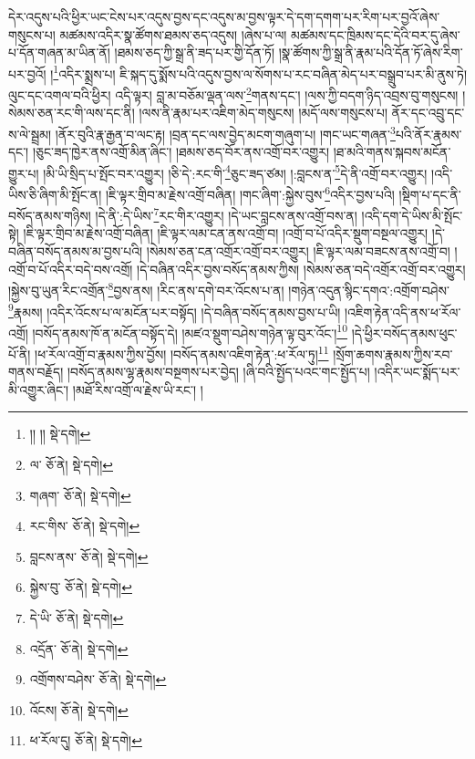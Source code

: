 དེར་འདུས་པའི་ཕྱིར་ཡང་ངེས་པར་འདུས་བྱས་དང་འདུས་མ་བྱས་ལྟར་དེ་དག་དགག་པར་རིག་པར་བྱའོ་ཞེས་གསུངས་པ། མཚམས་འདིར་སྣ་ཚོགས་ཐམས་ཅད་འདུས། །ཞེས་པ་ལ། མཚམས་དང་ཁྲིམས་དང་དེའི་བར་དུ་ཞེས་པ་དོན་གཞན་མ་ཡིན་ནོ། །ཐམས་ཅད་ཀྱི་སྒྲ་ནི་ཟད་པར་གྱི་དོན་ཏོ། །སྣ་ཚོགས་ཀྱི་སྒྲ་ནི་རྣམ་པའི་དོན་ཏོ་ཞེས་རིག་པར་བྱའོ། །\footnote{།། །།  སྡེ་དགེ། }འདིར་སྨྲས་པ། ཇི་སྐད་དུ་སྨོས་པའི་འདུས་བྱས་ལ་སོགས་པ་རང་བཞིན་མེད་པར་བསྒྲུབ་པར་མི་ནུས་ཏེ། ལུང་དང་འགལ་བའི་ཕྱིར། འདི་ལྟར། བླ་མ་བཅོམ་ལྡན་ལས་\footnote{ལ་  ཅོ་ནེ།  སྡེ་དགེ། }གནས་དང་། །ལས་ཀྱི་བདག་ཉིད་འབྲས་བུ་གསུངས། །སེམས་ཅན་རང་གི་ལས་དང་ནི། །ལས་ནི་རྣམ་པར་འཇིག་མེད་གསུངས། །མདོ་ལས་གསུངས་པ། ནོར་དང་འབྲུ་དང་ས་ལེ་སྦྲམ། །ནོར་བུའི་རྣ་རྒྱན་བ་ལང་རྟ། །བྲན་དང་ལས་བྱེད་མངག་གཞུག་པ། །གང་ཡང་གཞན་\footnote{གཞག་  ཅོ་ནེ།  སྡེ་དགེ། }པའི་ནོར་རྣམས་དང་། །ཅུང་ཟད་ཁྱེར་ནས་འགྲོ་མིན་ཞིང་། །ཐམས་ཅད་བོར་ནས་འགྲོ་བར་འགྱུར། །ཐ་མའི་གནས་སྐབས་མངོན་གྱུར་པ། །མི་ཡི་སྲིད་པ་སྤོང་བར་འགྱུར། །ཅི་དེ་:རང་གི་\footnote{རང་གིས་  ཅོ་ནེ།  སྡེ་དགེ། }ཅུང་ཟད་ཙམ། །:བླངས་ན་\footnote{བླངས་ནས་  ཅོ་ནེ།  སྡེ་དགེ། }དེ་ནི་འགྲོ་བར་འགྱུར། །འདི་ཡིས་ཅི་ཞིག་མི་སྤོང་ན། །ཇི་ལྟར་གྲིབ་མ་རྗེས་འགྲོ་བཞིན། །གང་ཞིག་:སྐྱེས་བུས་\footnote{སྐྱེས་བུ་  ཅོ་ནེ།  སྡེ་དགེ། }འདིར་བྱས་པའི། །སྡིག་པ་དང་ནི་བསོད་ནམས་གཉིས། །དེ་ནི་:དེ་ཡིས་\footnote{དེ་ཡི་  ཅོ་ནེ།  སྡེ་དགེ། }རང་གིར་འགྱུར། །དེ་ཡང་བླངས་ནས་འགྲོ་བས་ན། །འདི་དག་དེ་ཡིས་མི་སྤོང་སྟེ། །ཇི་ལྟར་གྲིབ་མ་རྗེས་འགྲོ་བཞིན། །ཇི་ལྟར་ལམ་ངན་ནས་འགྲོ་བ། །འགྲོ་བ་པོ་འདིར་སྡུག་བསྔལ་འགྱུར། །དེ་བཞིན་བསོད་ནམས་མ་བྱས་པའི། །སེམས་ཅན་ངན་འགྲོར་འགྲོ་བར་འགྱུར། །ཇི་ལྟར་ལམ་བཟངས་ནས་འགྲོ་བ། །འགྲོ་བ་པོ་འདིར་བདེ་བས་འགྲོ། །དེ་བཞིན་འདིར་བྱས་བསོད་ནམས་ཀྱིས། །སེམས་ཅན་བདེ་འགྲོར་འགྲོ་བར་འགྱུར། །སྐྱེས་བུ་ཡུན་རིང་འགྲོན་\footnote{འདྲོན་  ཅོ་ནེ།  སྡེ་དགེ། }བྱས་ནས། །རིང་ནས་དགེ་བར་འོངས་པ་ན། །གཉེན་འདུན་སྙིང་དགའ་:འགྲོག་བཤེས་\footnote{འགྲོགས་བཤེས་  ཅོ་ནེ།  སྡེ་དགེ། }རྣམས། །འདིར་འོངས་པ་ལ་མངོན་པར་བསྟོད། །དེ་བཞིན་བསོད་ནམས་བྱས་པ་ཡི། །འཇིག་རྟེན་འདི་ནས་ཕ་རོལ་འགྲོ། །བསོད་ནམས་ཁོ་ན་མངོན་བསྟོད་དེ། །མཛའ་སྡུག་བཤེས་གཉེན་ལྟ་བུར་འོང་།\footnote{འོངས།  ཅོ་ནེ།  སྡེ་དགེ། } །དེ་ཕྱིར་བསོད་ནམས་ཕུང་པོ་ནི། །ཕ་རོལ་འགྲོ་བ་རྣམས་ཀྱིས་བྱོས། །བསོད་ནམས་འཇིག་རྟེན་:ཕ་རོལ་ཏུ།\footnote{ཕ་རོལ་དུ།  ཅོ་ནེ།  སྡེ་དགེ། } །སྲོག་ཆགས་རྣམས་ཀྱིས་རབ་གནས་བརྗོད། །བསོད་ནམས་ལྷ་རྣམས་བསྔགས་པར་བྱེད། །ཞི་བའི་སྤྱོད་པའང་གང་སྤྱོད་པ། །འདིར་ཡང་སྨོད་པར་མི་འགྱུར་ཞིང་། །མཐོ་རིས་འགྲོ་ལ་རྗེས་ཡི་རང་། །

